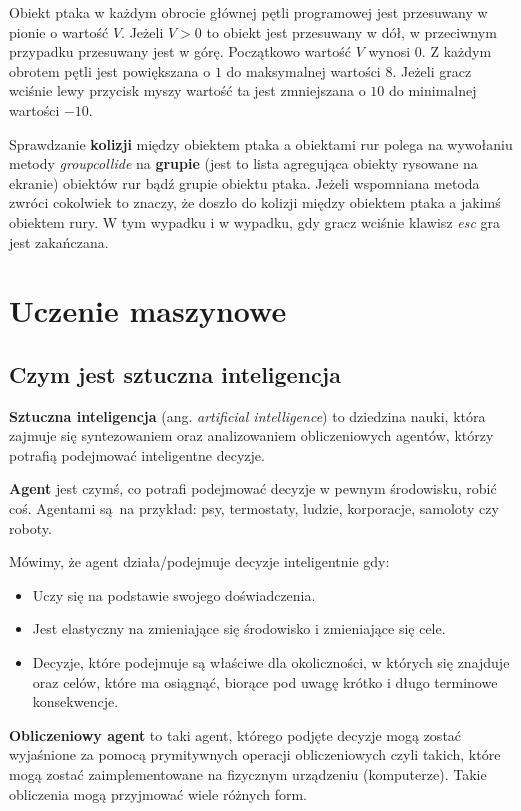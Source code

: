 \documentclass[a4paper, 12pt,oneside]{book}
\begin{document}
Obiekt ptaka w każdym obrocie głównej pętli programowej jest przesuwany
w pionie o wartość $V$. Jeżeli $V > 0$ to obiekt jest przesuwany w dół,
w przeciwnym przypadku przesuwany jest w górę. Początkowo wartość $V$ wynosi
$0$. Z każdym obrotem pętli jest powiększana o $1$ do maksymalnej wartości $8$.
Jeżeli gracz wciśnie lewy przycisk myszy wartość ta jest zmniejszana o $10$ do
minimalnej wartości $-10$.

Sprawdzanie \textbf{kolizji} między obiektem ptaka a obiektami rur polega na
wywołaniu metody \textit{groupcollide} na \textbf{grupie} (jest to lista
agregująca obiekty rysowane na ekranie) obiektów rur bądź grupie obiektu ptaka. 
Jeżeli wspomniana metoda zwróci cokolwiek to znaczy, że doszło do kolizji
między obiektem ptaka a jakimś obiektem rury. W tym wypadku i w wypadku, gdy
gracz wciśnie klawisz \textit{esc} gra jest zakańczana.

\chapter{Uczenie maszynowe}
\label{chapter:uczenie}
\section{Czym jest sztuczna inteligencja}
\textbf{Sztuczna inteligencja} (ang. \textit{artificial intelligence}) to
dziedzina nauki, która zajmuje się syntezowaniem oraz analizowaniem
obliczeniowych agentów, którzy potrafią podejmować inteligentne decyzje.

\textbf{Agent} jest czymś, co potrafi podejmować decyzje w pewnym środowisku,
robić coś. Agentami są na przykład: psy, termostaty, ludzie, korporacje,
samoloty czy roboty.

Mówimy, że agent działa/podejmuje decyzje inteligentnie gdy:
\begin{itemize}
	\setlength\itemsep{-0.4em}
	\item Uczy się na podstawie swojego doświadczenia.
	\item Jest elastyczny na zmieniające się środowisko i zmieniające się
		cele.
	\item Decyzje, które podejmuje są właściwe dla okoliczności, w których
		się znajduje oraz celów, które ma osiągnąć, biorące pod uwagę
		krótko i długo terminowe konsekwencje.
\end{itemize}

\textbf{Obliczeniowy agent} to taki agent, którego podjęte decyzje mogą
zostać wyjaśnione za pomocą prymitywnych operacji obliczeniowych
czyli takich, które mogą zostać zaimplementowane na fizycznym urządzeniu
(komputerze). Takie obliczenia mogą przyjmować wiele różnych form.
\end{document}
